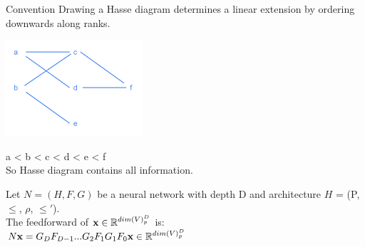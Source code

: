Convention Drawing a Hasse diagram determines a linear extension by ordering downwards along ranks.\\
    \begin{center}
        \includegraphics[width=2in]{images/Chapter 10/convention.png}
    \end{center}
    a < b < c < d < e < f\\
So Hasse diagram contains all information.\\


\begin{definition}
    Let $N = (H,F,G)$ be a neural network with depth D and architecture $H$ = (P, $\leq$, $\rho$, $\leq'$).\\
    The feedforward of ${\vx} \in \mathbb{R}^{dim(V)_p^{D}}$ is:\\
        $N{\vx} = G_{D}F_{D-1}...G_{2}F_{1}G_{1}F_{0}{\vx} \in \mathbb{R}^{dim(V)_p^{D}}$
\end{definition}

